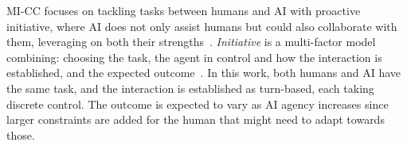 




MI-CC focuses on tackling tasks between humans and AI with proactive initiative, where AI does not only assist humans but could also collaborate with them, leveraging on both their strengths~\cite{p13yannakakis_mixed-initiative_2014,allen_mixed-initiative_1999}. \emph{Initiative} is a multi-factor model combining: choosing the task, the agent in control and how the interaction is established, and the expected outcome~\cite{p13novick_what_1997}. In this work, both humans and AI have the same task, and the interaction is established as turn-based, each taking discrete control. The outcome is expected to vary as AI agency increases since larger constraints are added for the human that might need to adapt towards those. 

